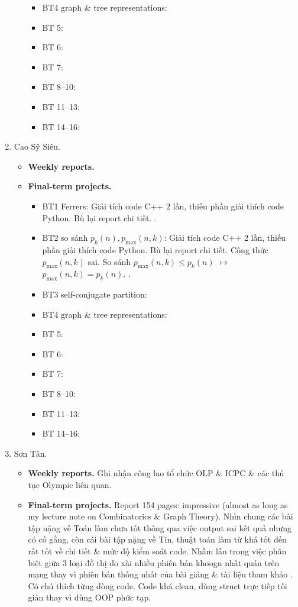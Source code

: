 \documentclass{article}
\begin{document}
\begin{enumerate}
\begin{itemize}
\begin{itemize}
            \item BT4 graph \& tree representations:
            \item BT 5:
            \item BT 6:
            \item BT 7:
            \item BT 8--10:
            \item BT 11--13:
            \item BT 14--16:
        \end{itemize}
    \end{itemize}
    \item {\sc Cao Sỹ Siêu.}
    \begin{itemize}
        \item {\bf Weekly reports.}
        \item {\bf Final-term projects.}
        \begin{itemize}
            \item BT1 Ferrers: Giải tích code C++ 2 lần, thiếu phần giải thích code Python. Bù lại report chi tiết. .
            \item BT2 so sánh $p_k(n),p_{\max}(n,k)$: Giải tích code C++ 2 lần, thiếu phần giải thích code Python. Bù lại report chi tiết. Công thức $p_{\max}(n,k)$ sai. So sánh \st{$p_{\max}(n,k)\le p_k(n)$} $\mapsto$ $p_{\max}(n,k) = p_k(n)$. .
            \item BT3 self-conjugate partition:
            \item BT4 graph \& tree representations:
            \item BT 5:
            \item BT 6:
            \item BT 7:
            \item BT 8--10:
            \item BT 11--13:
            \item BT 14--16:
        \end{itemize}
    \end{itemize}
    \item {\sc Sơn Tân.}
    \begin{itemize}
        \item {\bf Weekly reports.} Ghi nhận công lao tổ chức OLP \& ICPC \& các thủ tục Olympic liên quan.
        \item {\bf Final-term projects.} Report 154 pages: impressive (almost as long as my lecture note on Combinatorics \& Graph Theory). Nhìn chung các bài tập nặng về Toán làm chưa tốt thông qua việc output sai kết quả nhưng có cố gắng, còn cái bài tập nặng về Tin, thuật toán làm từ khá tốt đến rất tốt về chi tiết \& mức độ kiểm soát code. Nhầm lẫn trong việc phân biệt giữa 3 loại đồ thị do xài nhiều phiên bản khoogn nhất quán trên mạng thay vì phiên bản thống nhất của bài giảng \& tài liệu tham khảo \cite{Shahriari2022}. Có chú thích từng dòng code. Code khá clean, dùng struct trực tiếp tối giản thay vì dùng OOP phức tạp.

\end{itemize}
\end{enumerate}
\end{document}
